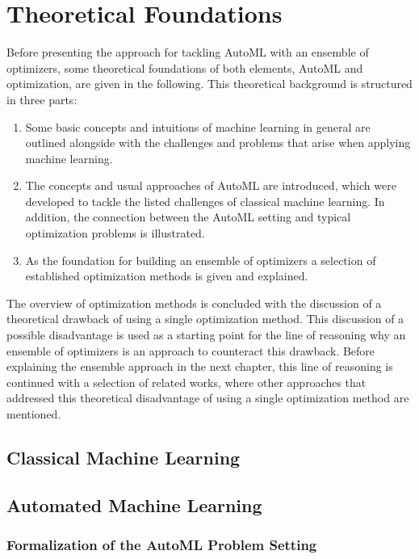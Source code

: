 %
\chapter{Theoretical Foundations}
\label{sec:theory}
Before presenting the approach for tackling AutoML with an ensemble of optimizers, some theoretical foundations of both elements, AutoML and optimization, are given in the following.
This theoretical background is structured in three parts:
\begin{enumerate}
    \item Some basic concepts and intuitions of machine learning in general are outlined alongside with the challenges and problems that arise when applying machine learning.
    \item The concepts and usual approaches of AutoML are introduced, which were developed to tackle the listed challenges of classical machine learning. In addition, the connection between the AutoML setting and typical optimization problems is illustrated.
    \item As the foundation for building an ensemble of optimizers a selection of established optimization methods is given and explained.
\end{enumerate}
The overview of optimization methods is concluded with the discussion of a theoretical drawback of using a single optimization method.
This discussion of a possible disadvantage is used as a starting point for the line of reasoning why an ensemble of optimizers is an approach to counteract this drawback.
Before explaining the ensemble approach in the next chapter, this line of reasoning is continued with a selection of related works, where other approaches that addressed this theoretical disadvantage of using a single optimization method are mentioned. 

\section{Classical Machine Learning}
\label{sec:theory:ml}

\Blindtext


\section{Automated Machine Learning}
\label{sec:theory:automl}

\Blindtext

\subsection{Formalization of the AutoML Problem Setting}
\label{sec:theory:automl:workflow}

